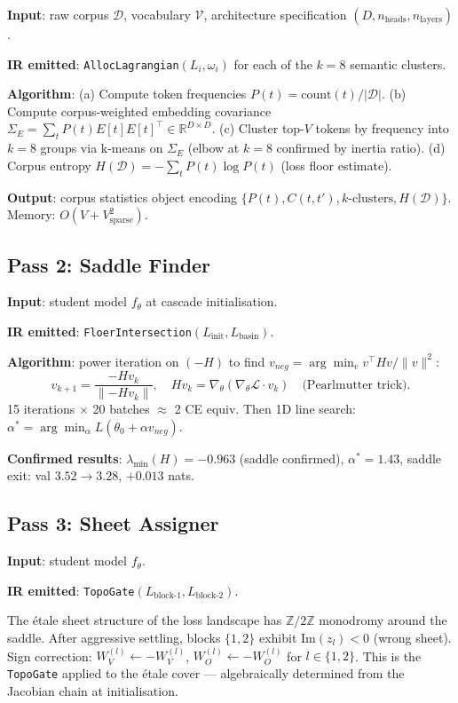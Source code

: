 \documentclass[11pt]{amsart}
\begin{document}
\textbf{Input}: raw corpus $\mathcal{D}$, vocabulary $\mathcal{V}$,
architecture specification $(D, n_\text{heads}, n_\text{layers})$.

\textbf{IR emitted}: \texttt{AllocLagrangian}$(L_i, \omega_i)$
for each of the $k=8$ semantic clusters.

\textbf{Algorithm}:
(a) Compute token frequencies $P(t) = \text{count}(t) / |\mathcal{D}|$.
(b) Compute corpus-weighted embedding covariance
$\Sigma_E = \sum_t P(t) E[t] E[t]^\top \in \mathbb{R}^{D \times D}$.
(c) Cluster top-$V$ tokens by frequency into $k=8$ groups
via k-means on $\Sigma_E$ (elbow at $k=8$ confirmed by inertia ratio).
(d) Corpus entropy $H(\mathcal{D}) = -\sum_t P(t) \log P(t)$
(loss floor estimate).

\textbf{Output}: corpus statistics object encoding
$\{P(t), C(t,t'), k\text{-clusters}, H(\mathcal{D})\}$.
Memory: $O(V + V^2_\text{sparse})$.

\subsection{Pass 2: Saddle Finder}

\textbf{Input}: student model $f_\theta$ at cascade initialisation.

\textbf{IR emitted}: \texttt{FloerIntersection}$(L_\text{init}, L_\text{basin})$.

\textbf{Algorithm}: power iteration on $(-H)$ to find
$v_{neg} = \arg\min_v v^\top H v / \|v\|^2$:
\[
  v_{k+1} = \frac{-H v_k}{\|{-H v_k}\|}, \quad
  H v_k = \nabla_\theta (\nabla_\theta \mathcal{L} \cdot v_k)
  \quad \text{(Pearlmutter trick)}.
\]
15 iterations $\times$ 20 batches $\approx$ 2 CE equiv.
Then 1D line search: $\alpha^* = \arg\min_\alpha L(\theta_0 + \alpha v_{neg})$.

\textbf{Confirmed results}:
$\lambda_{\min}(H) = -0.963$ (saddle confirmed),
$\alpha^* = 1.43$, saddle exit: val $3.52 \to 3.28$, $+0.013$ nats.

\subsection{Pass 3: Sheet Assigner}

\textbf{Input}: student model $f_\theta$.

\textbf{IR emitted}: \texttt{TopoGate}$(L_\text{block-1}, L_\text{block-2})$.

The étale sheet structure of the loss landscape has $\mathbb{Z}/2\mathbb{Z}$
monodromy around the saddle. After aggressive settling, blocks
$\{1,2\}$ exhibit $\text{Im}(z_l) < 0$ (wrong sheet).
Sign correction: $W_V^{(l)} \leftarrow -W_V^{(l)}$,
$W_O^{(l)} \leftarrow -W_O^{(l)}$ for $l \in \{1,2\}$.
This is the \texttt{TopoGate} applied to the étale cover ---
algebraically determined from the Jacobian chain at initialisation.
\end{document}
